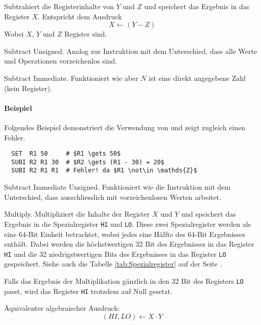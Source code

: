 Subtrahiert die Registerinhalte von $Y$ und $Z$ und speichert das Ergebnis in
das Register $X$. Entspricht dem Ausdruck
\[
    X \gets (Y - Z)
\]
Wobei $X$, $Y$ und $Z$ Register sind.



\glqq Subtract Unsigned\grqq.
Analog zur Instruktion  mit dem Unterschied, dass alle Werte und
Operationen vorzeichenlos sind.


\glqq Subtract Immediate\grqq.
Funktioniert wie  aber $N$ ist eine direkt angegebene Zahl
(kein Register).

\paragraph{Beispiel}
Folgendes Beispiel demonstriert die Verwendung von  und zeigt
zugleich einen Fehler.
\begin{lstlisting}
  SET  R1 50     # $R1 \gets 50$
  SUBI R2 R1 30  # $R2 \gets (R1 - 30) = 20$
  SUBI R2 R1 R1  # Fehler! da $R1 \not\in \mathds{Z}$
\end{lstlisting}


\glqq Subtract Immediate Unsigned\grqq.
Funktioniert wie die Instruktion  mit dem Unterschied, dass
 ausschliesslich mit vorzeichenlosen Werten arbeitet. 



\glqq Multiply\grqq. 
Multipliziert die Inhalte der Register $X$ und $Y$ und speichert das Ergebnis in
die Spezialregister \texttt{HI} und \texttt{LO}. Diese zwei Spezialregister
werden als eine 64-Bit Einheit betrachtet, wobei jedes eine Hälfte des
64-Bit Ergebnisses enthält.
Dabei werden die höchstwertigen 32 Bit des Ergebnisses in das Register
\texttt{HI}
und die 32 niedrigstwertigen Bits des Ergebnisses in das Register
\texttt{LO} gespeichert.
Siehe auch die Tabelle \ref{tab:Spezialregister} auf der Seite
\pageref{tab:Spezialregister}.

Falls das Ergebnis der Multiplikation gänzlich in den 32 Bit des Registers
\texttt{LO} passt, wird das Register \texttt{HI} trotzdem auf Null gesetzt.

Äquivalenter algebraischer Ausdruck:
\[
    (HI, LO) \gets X \cdot Y
\]

